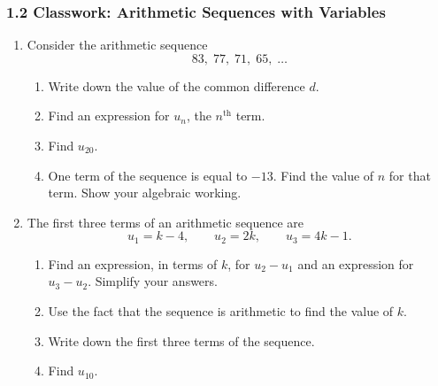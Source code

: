 \documentclass[12pt, twoside]{article}
\begin{document}
\subsubsection*{1.2 Classwork: Arithmetic Sequences with Variables}

\begin{enumerate}[itemsep=0.15cm]

\item[1.]

Consider the arithmetic sequence
$$83,\; 77,\; 71,\; 65,\; \ldots$$

\begin{enumerate}[itemsep=0.1cm]
  \item Write down the value of the common difference $d$.
  \item Find an expression for $u_{n}$, the $n^{\text{th}}$ term.
  \item Find $u_{20}$.
  \item One term of the sequence is equal to $-13$. Find the value of
  $n$ for that term. Show your algebraic working.
\end{enumerate}


\newpage

\item[2.]

The first three terms of an arithmetic sequence are
$$u_{1} = k - 4, \qquad u_{2} = 2k, \qquad u_{3} = 4k - 1.$$

\begin{enumerate}[itemsep=0.1cm]
  \item Find an expression, in terms of $k$, for $u_{2} - u_{1}$ and
  an expression for $u_{3} - u_{2}$. Simplify your answers.
  \item Use the fact that the sequence is arithmetic to find the value
  of $k$.
  \item Write down the first three terms of the sequence.
  \item Find $u_{10}$.
\end{enumerate}


\end{enumerate}
\end{document}
